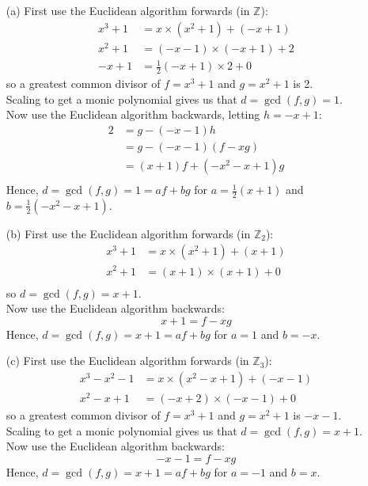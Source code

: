\documentclass[11pt]{article}
\begin{document}
\newpage{}
\begin{itemize}
  \item[{(a)}]
    First use the Euclidean algorithm forwards (in $\mathbb{Z}$):
    \begin{align*}
      x^3+1 &=     x \times (x^2+1) + (-x+1)\\
      x^2+1 &= (-x-1)\times  (-x+1) +  2\\
       -x+1 &= \frac{1}{2}(-x+1)\times 2 + 0
    \end{align*}
    so a greatest common divisor of $f = x^3 + 1$ and $g = x^2 + 1$ is 2.\\
    Scaling to get a monic polynomial gives us that $d = \gcd(f,g) = 1$.\\
    Now use the Euclidean algorithm backwards, letting $h = -x + 1$:
    \begin{align*}
       2  &= g - (-x-1)h\\
          &= g - (-x-1)(f - xg)\\
          &= (x+1)f + (-x^2 - x + 1) g\\
    \end{align*}
    Hence, $d = \gcd(f,g) = 1 = af + bg$
    for $a = \frac{1}{2}(x+1)$
    and $b = \frac{1}{2}(-x^2 - x + 1)$.
  \item[{(b)}]
    First use the Euclidean algorithm forwards (in $\mathbb{Z}_2$):
    \begin{align*}
      x^3+1 &=     x \times (x^2+1) + (x+1)\\
      x^2+1 &= (x+1) \times  (x+1) +  0\\
    \end{align*}
    so $d = \gcd(f,g) = x + 1$.\\
    Now use the Euclidean algorithm backwards:
    \[
      x + 1 = f - xg
    \]
    Hence, $d = \gcd(f,g) = x + 1 = af + bg$ for $a = 1$ and $b = -x$.
  \item[{(c)}]
    First use the Euclidean algorithm forwards (in $\mathbb{Z}_3$):
    \begin{align*}
      x^3-x^2-1 &=   x\times (x^2 - x + 1) + (-x-1)\\
      x^2-x + 1 &= (-x+2)\times (-x-1) +  0
    \end{align*}
    so a greatest common divisor of $f = x^3 + 1$ and $g = x^2 + 1$ is $-x-1$.\\
    Scaling to get a monic polynomial gives us that $d = \gcd(f,g) = x+1$.\\
    Now use the Euclidean algorithm backwards:
    \[
      -x-1 = f - xg
    \]
    Hence, $d = \gcd(f,g) = x+1 = af + bg$
    for $a = -1$
    and $b = x$.
\end{itemize}
\end{document}
